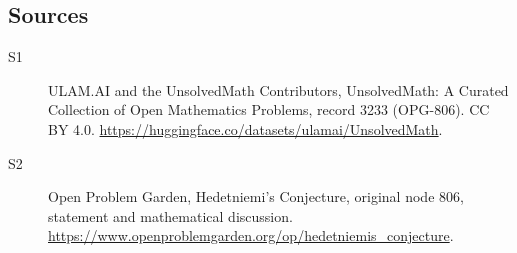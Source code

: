 \documentclass[11pt]{article}
\begin{document}
\subsection{Sources}
\begin{description}
\item[\hypertarget{source:3233:1}{S1}] ULAM.AI and the UnsolvedMath Contributors, UnsolvedMath: A Curated Collection of Open Mathematics Problems, record 3233 (OPG-806). CC BY 4.0. \url{https://huggingface.co/datasets/ulamai/UnsolvedMath}.
\item[\hypertarget{source:3233:2}{S2}] Open Problem Garden, Hedetniemi's Conjecture, original node 806, statement and mathematical discussion. \url{https://www.openproblemgarden.org/op/hedetniemis_conjecture}.
\end{description}
\label{end:3233}
\end{document}
